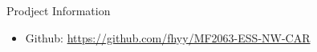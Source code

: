 \documentclass[final,hyperref={pdfpagelabels=false}]{beamer}
\begin{document}
\begin{frame}[t]
\begin{columns}[t]
\begin{column}{.465\textwidth}

\begin{block}{Prodject Information}

\begin{itemize}
\item Github: \href{https://github.com/fhyy/MF2063-ESS-NW-CAR}{https://github.com/fhyy/MF2063-ESS-NW-CAR}

\end{itemize}

\end{block}


\end{column} %

\begin{column}{.015\textwidth}\end{column} %

\end{columns} %

\end{frame} %
\end{document}
